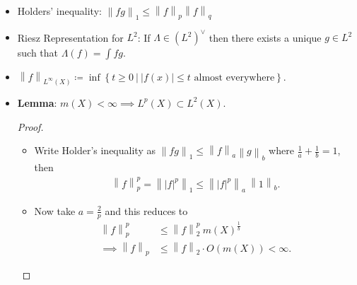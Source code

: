 \begin{solution}

\hfill

\begin{concept}

\hfill

\begin{itemize}
\item
  Holders' inequality:
  \({\left\lVert {fg} \right\rVert}_1 \leq {\left\lVert {f} \right\rVert}_p {\left\lVert {f} \right\rVert}_q\)
\item
  Riesz Representation for \(L^2\): If \(\Lambda \in (L^2)^\vee\) then
  there exists a unique \(g\in L^2\) such that \(\Lambda(f) = \int fg\).
\item
  \({\left\lVert {f} \right\rVert}_{L^\infty(X)} \coloneqq\inf \left\{{t\geq 0 {~\mathrel{\Big|}~}{\left\lvert {f(x)} \right\rvert} \leq t \text{ almost everywhere} }\right\}\).
\item
  \textbf{Lemma}: \(m(X) < \infty \implies L^p(X) \subset L^2(X)\).

  \begin{proof}

  \hfill

  \begin{itemize}
  \item
    Write Holder's inequality as
    \({\left\lVert {fg} \right\rVert}_1 \leq {\left\lVert {f} \right\rVert}_a {\left\lVert {g} \right\rVert}_b\)
    where \(\frac 1 a + \frac 1 b = 1\), then
    \begin{align*}
    {\left\lVert {f} \right\rVert}_p^p = {\left\lVert {{\left\lvert {f} \right\rvert}^p} \right\rVert}_1 \leq {\left\lVert {{\left\lvert {f} \right\rvert}^p} \right\rVert}_a ~{\left\lVert {1} \right\rVert}_b
    .\end{align*}
  \item
    Now take \(a = \frac 2 p\) and this reduces to
    \begin{align*}
    {\left\lVert {f} \right\rVert}_p^p &\leq {\left\lVert {f} \right\rVert}_2^p ~m(X)^{\frac 1 b} \\
    \implies {\left\lVert {f} \right\rVert}_p &\leq {\left\lVert {f} \right\rVert}_2 \cdot O(m(X)) < \infty
    .\end{align*}
  \end{itemize}

  \end{proof}
\end{itemize}

\end{concept}


\end{solution}
